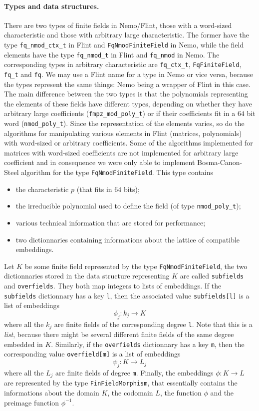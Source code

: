 \paragraph{Types and data structures.} There are two types of finite fields in Nemo/Flint,
those with a word-sized characteristic and those with arbitrary large
characteristic. The former have the type \texttt{fq\_nmod\_ctx\_t} in Flint and
\texttt{FqNmodFiniteField} in Nemo, while the field elements have the type
\texttt{fq\_nmod\_t} in Flint and \texttt{fq\_nmod} in Nemo. The corresponding types in arbitrary
characteristic are \texttt{fq\_ctx\_t}, \texttt{FqFiniteField},
\texttt{fq\_t} and
\texttt{fq}. We may use a Flint name for a type in Nemo or vice versa, because
the types represent the same things: Nemo being a wrapper of Flint in this case.
The main difference between the two types is that the polynomials representing the
elements of these fields have different types, depending on whether they have
arbitrary large coefficients (\texttt{fmpz\_mod\_poly\_t}) or if their
coefficients fit in a $64$ bit word (\texttt{nmod\_poly\_t}). Since the
representation of the elements varies, so do the algorithms for manipulating
various elements in Flint (matrices, polynomials) with word-sized or arbitrary
coefficients. Some of the algorithms implemented for matrices with word-sized
coefficients are not implemented for arbitrary large coefficient and in
consequence we were only able to implement Bosma-Canon-Steel algorithm for the
type \texttt{FqNmodFiniteField}. This type contains
\begin{itemize}
  \item the characteristic $p$ (that fits in $64$ bits);
  \item the irreducible polynomial used to define the field (of type
    \texttt{nmod\_poly\_t});
  \item various technical information that are stored for performance;
  \item two dictionnaries containing informations about the lattice of
    compatible embeddings.
\end{itemize}
Let $K$ be some finite field represented by the type \texttt{FqNmodFiniteField},
the two dictionnaries stored in the data structure representing $K$ are called
\texttt{subfields} and \texttt{overfields}. They both map integers to lists of
embeddings. If the \texttt{subfields} dictionnary has a key \texttt{l}, then the
associated value \texttt{subfields[l]} is a list of embeddings
\[
  \phi_j: k_j\to K
\]
where all the $k_j$ are finite fields of the corresponding degree
\texttt{l}. Note that this is a \emph{list}, because there might be several
different finite fields of the same degree embedded in $K$. Similarly, if the
\texttt{overfields} dictionnary has a key \texttt{m}, then the corresponding
value \texttt{overfield[m]} is a list of embeddings
\[
  \psi_j:K\to L_j
\]
where all the $L_j$ are finite fields of degree \texttt{m}. Finally, the
embeddings $\phi:K\to L$ are represented by the type \texttt{FinFieldMorphism}, that
essentially contains the informations about the domain $K$, the codomain $L$,
the function $\phi$ and the preimage function $\phi^{-1}$.

